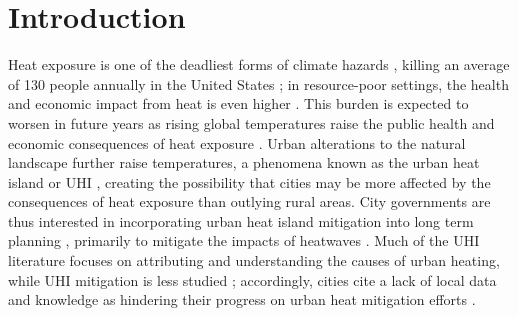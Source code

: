 \documentclass[draft,linenumbers]{agujournal}
\begin{document}
% 


%
% 
% 
% 


\section{Introduction}\label{sec:intro}
Heat exposure is one of the deadliest forms of climate hazards \cite{wmo}, killing an average of 130 people annually in the United States \citep{usnh_stat}; in resource-poor settings, the health and economic impact from heat is even higher \citep{wmo}. This burden is expected to worsen in future years as rising global temperatures raise the public health and economic consequences of heat exposure \citep{ipcc}. 
Urban alterations to the natural landscape further raise temperatures, a phenomena known as the urban heat island or UHI \citep{oke82}, creating the possibility that cities may be more affected by the consequences of heat exposure than outlying rural areas.
City governments are thus interested in incorporating urban heat island mitigation into long term planning \citep{shickman2016current}, primarily to mitigate the impacts of heatwaves \citep{hewitt2014cool}. Much of the UHI literature focuses on attributing and understanding the causes of urban heating, while UHI mitigation is less studied \citep{huang2018urban}; accordingly, cities cite a lack of local data and knowledge as hindering their progress on urban heat mitigation efforts \citep{hewitt2014cool}.
 
\end{document}
